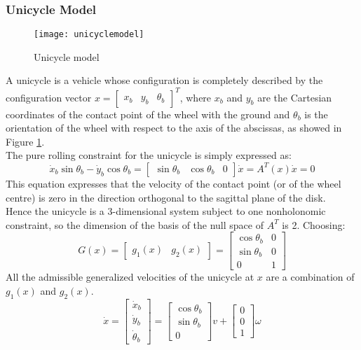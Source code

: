 \subsubsection{Unicycle Model}
\begin{figure}[h!]
	\centering
	\texttt{[image: unicyclemodel]}
	\caption{Unicycle model}
	\label{fig:unicyclemodel}
\end{figure}
A unicycle is a vehicle whose configuration is completely described by the configuration vector $x = \left[\begin{matrix}x_b&y_b&\theta_b\end{matrix}\right]^T$, where $x_b$ and $y_b$ are the Cartesian coordinates of the contact point of the wheel with the ground and $\theta_b$ is the orientation of the wheel with respect to the axis of the abscissas, as showed in Figure \ref{fig:unicyclemodel}. \\
The pure rolling constraint for the unicycle is simply expressed as:
\begin{equation} \label{At}
\dot{x}_b\sin\theta_b-\dot{y}_b\cos\theta_b=\left[
\begin{matrix}
\sin\theta_b & \cos\theta_b & 0
\end{matrix}
\right] \dot{x}= A^T \left( x \right)\dot{x} =0  
\end{equation}
This equation expresses that the velocity of the contact point (or of the wheel centre) is zero in the direction orthogonal to the sagittal plane of the disk.\\
Hence the unicycle is a 3-dimensional system subject to one nonholonomic constraint, so the dimension of the basis of the null space of $A^T$ is 2. Choosing:
\begin{equation} \label{Gmatrix_def}
G(x)=\left[
\begin{matrix}
g_1 (x) & g_2 (x)
\end{matrix}
\right] =  \left[
\begin{matrix}
\cos\theta_b & 0 \\
\sin\theta_b & 0 \\
0 & 1 
\end{matrix}
\right] 
\end{equation}
All the admissible generalized velocities of the unicycle at $x$ are a combination of $g_1 (x)$ and $g_2 (x)$.
\begin{equation} 
\dot{x}=\left[
\begin{matrix}
\dot{x}_b \\ \dot{y}_b \\\dot{\theta}_b
\end{matrix}
\right] =  \left[
\begin{matrix}
\cos\theta_b \\ \sin\theta_b \\ 0 
\end{matrix}
\right]v + \left[
\begin{matrix}
0 \\ 0 \\ 1 
\end{matrix}
\right]\omega
\end{equation}
